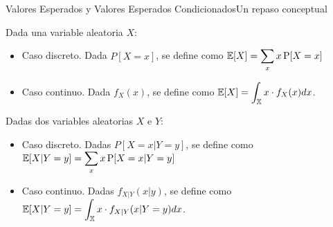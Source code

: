 \documentclass[10pt, envcountsect, handout, aspectratio=1610, hyperref={hypertexnames=true}]{beamer}
\begin{document}
\begin{frame}{Valores Esperados y Valores Esperados Condicionados}{Un repaso conceptual}
\begin{definition}
Dada una variable aleatoria $X$:
\begin{itemize}
\item Caso discreto. Dada $P[X=x]$, se define como $\displaystyle \mathbb{E} [X]=\sum _{x} x \operatorname {P} [X=x]$
\item Caso continuo. Dada $f_{X}(x)$, se define como $\displaystyle\mathbb{E} [X]= \int _{\mathbb {X} }x \cdot f_{X}(x)dx$.
\end{itemize}
\end{definition}

\begin{definition}
Dadas dos variables aleatorias $X$ e $Y$:
\begin{itemize}
\item Caso discreto. Dadas $P[X=x|Y=y]$, se define como $\displaystyle \mathbb{E} [X|Y=y]=\sum _{x} x \operatorname {P} [X=x|Y=y]$
\item Caso continuo. Dadas $f_{X|Y}(x|y)$, se define como $\displaystyle\mathbb{E} [X|Y=y]= \int _{\mathbb {X} } x \cdot f_{X|Y}(x|Y=y)dx$.
\end{itemize}
\end{definition}

\centerline{\Huge {} \large {}}

\end{frame}
\end{document}
